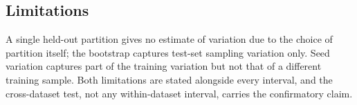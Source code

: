 \subsection{Limitations}

A single held-out partition gives no estimate of variation due to the choice of
partition itself; the bootstrap captures test-set sampling variation only.
Seed variation captures part of the training variation but not that of a
different training sample. Both limitations are stated alongside every
interval, and the cross-dataset test, not any within-dataset interval, carries
the confirmatory claim.
